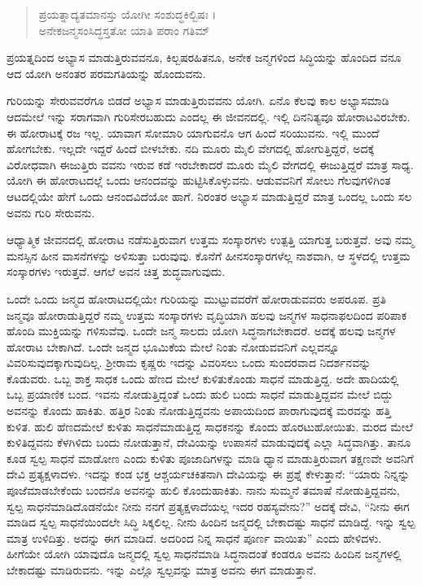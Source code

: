 \begin{verse}
ಪ್ರಯತ್ನಾದ್ಯತಮಾನಸ್ತು ಯೋಗೀ ಸಂಶುದ್ಧಕಿಲ್ಬಿಷಃ ।\\ಅನೇಕಜನ್ಮಸಂಸಿದ್ಧಸ್ತತೋ ಯಾತಿ ಪರಾಂ ಗತಿಮ್ 
\end{verse}

{\small ಪ್ರಯತ್ನದಿಂದ ಅಭ್ಯಾಸ ಮಾಡುತ್ತಿರುವವನೂ, ಕಿಲ್ಬಷರಹಿತನೂ, ಅನೇಕ ಜನ್ಮಗಳಿಂದ ಸಿದ್ಧಿಯನ್ನು ಹೊಂದಿದ ವನೂ ಆದ ಯೋಗಿ ಅನಂತರ ಪರಮಗತಿಯನ್ನು ಹೊಂದುವನು.}

ಗುರಿಯನ್ನು ಸೇರುವವರೆಗೂ ಬಿಡದೆ ಅಭ್ಯಾಸ ಮಾಡುತ್ತಿರುವವನು ಯೋಗಿ. ಏನೊ ಕೆಲವು ಕಾಲ ಅಭ್ಯಾಸಮಾಡಿ ಆದಮೇಲೆ ಇನ್ನು ಸರಾಗವಾಗಿ ಗುರಿಸೇರಬಹುದು ಎಂದಲ್ಲ ಈ ಜೀವನದಲ್ಲಿ. ಇಲ್ಲಿ ದಿನನಿತ್ಯವೂ ಹೋರಾಟವಿರಬೇಕು. ಈ ಹೋರಾಟಕ್ಕೆ ರಜ ಇಲ್ಲ. ಯಾವಾಗ ಸೋಮಾರಿ ಯಾಗುವನೊ ಆಗ ಹಿಂದೆ ಸರಿಯುವನು. ಇಲ್ಲಿ ಮುಂದೆ ಹೋಗಬೇಕು. ಇಲ್ಲದೇ ಇದ್ದರೆ ಹಿಂದೆ ಬೀಳಬೇಕು. ನದಿ ಮೂರು ಮೈಲಿ ವೇಗದಲ್ಲಿ ಹೋಗುತ್ತಿದ್ದರೆ, ಅದಕ್ಕೆ ವಿರೋಧವಾಗಿ ಈಜುತ್ತಿರು ವವನು ಇರುವ ಕಡೆ ಇರಬೇಕಾದರೆ ಮೂರು ಮೈಲಿ ವೇಗದಲ್ಲಿ ಈಜುತ್ತಿದ್ದರೆ ಮಾತ್ರ ಸಾಧ್ಯ. ಯೋಗಿ ಈ ಹೋರಾಟದಲ್ಲೆ ಒಂದು ಆನಂದವನ್ನು ಹುಟ್ಟಿಸಿಕೊಳ್ಳುವನು. ಆಡುವವನಿಗೆ ಸೋಲು ಗೆಲವುಗಳಿಗಿಂತ ಆಟದಲ್ಲಿಯೇ ಹೇಗೆ ಒಂದು ಆನಂದವಿದೆಯೋ ಹಾಗೆ. ನಿರಂತರ ಅಭ್ಯಾಸ ಮಾಡುತ್ತಿದ್ದರೆ ಮಾತ್ರ ಒಂದಲ್ಲ ಒಂದು ಸಲ ಅವನು ಗುರಿ ಸೇರುವನು.

ಆಧ್ಯಾತ್ಮಿಕ ಜೀವನದಲ್ಲಿ ಹೋರಾಟ ನಡೆಸುತ್ತಿರುವಾಗ ಉತ್ತಮ ಸಂಸ್ಕಾರಗಳು ಉತ್ಪತ್ತಿ ಯಾಗುತ್ತ ಬರುತ್ತವೆ. ಅವು ನಮ್ಮ ಮನಸ್ಸಿನ ಹೀನ ವಾಸನೆಗಳನ್ನು ಅಳಿಸುತ್ತಾ ಬರುವುವು. ಕೊನೆಗೆ ಹೀನಸಂಸ್ಕಾರಗಳೆಲ್ಲ ನಾಶವಾಗಿ, ಆ ಸ್ಥಳದಲ್ಲಿ ಉತ್ತಮ ಸಂಸ್ಕಾರಗಳು ಇರುತ್ತವೆ. ಆಗಲೆ ಅವನ ಚಿತ್ತ ಶುದ್ಧವಾಗುವುದು. 

ಒಂದೇ ಒಂದು ಜನ್ಮದ ಹೋರಾಟದಲ್ಲಿಯೇ ಗುರಿಯನ್ನು ಮುಟ್ಟುವವರೆಗೆ ಹೋರಾಡುವವರು ಅಪರೂಪ. ಪ್ರತಿ ಜನ್ಮವೂ ಹೋರಾಡುತ್ತಿದ್ದರೆ ನಮ್ಮ ಉತ್ತಮ ಸಂಸ್ಕಾರಗಳು ವೃದ್ಧಿಯಾಗಿ ಹಲವು ಜನ್ಮಗಳ ಸಾಧನಾಫಲದಿಂದ ಪರಿಪಾಕ ಹೊಂದಿ ಮುಕ್ತಿಯನ್ನು ಗಳಿಸುವೆವು. ಒಂದೇ ಜನ್ಮ ಸಾಲದು ಯೋಗಿ ಸಿದ್ಧನಾಗಬೇಕಾದರೆ. ಅದಕ್ಕೆ ಹಲವು ಜನ್ಮಗಳ ಹೋರಾಟ ಬೇಕಾಗಿದೆ. ಒಂದೇ ಜನ್ಮದ ಭೂಮಿಕೆಯ ಮೇಲೆ ನಿಂತು ನೋಡುವವನಿಗೆ ಎಲ್ಲವನ್ನೂ ವಿವರಿಸುವುದಕ್ಕಾಗುವುದಿಲ್ಲ. ಶ್ರೀರಾಮ ಕೃಷ್ಣರು ಇದನ್ನು ವಿವರಿಸಲು ಒಂದು ಸುಂದರವಾದ ನಿದರ್ಶನವನ್ನು ಕೊಡುವರು. ಒಬ್ಬ ಶಾಕ್ತ ಸಾಧಕ ಒಂದು ಹೆಣದ ಮೇಲೆ ಕುಳಿತುಕೊಂಡು ಸಾಧನೆ ಮಾಡುತ್ತಿದ್ದ. ಅದೇ ಹಾದಿಯಲ್ಲಿ ಒಬ್ಬ ಪ್ರಯಾಣಿಕ ಬಂದ. ಇವನು ನೋಡುತ್ತಿದ್ದಂತೆ ಒಂದು ಹುಲಿ ಬಂದು ಸಾಧನೆ ಮಾಡುತ್ತಿದ್ದವನ ಮೇಲೆ ಬಿದ್ದು ಅವನನ್ನು ಕೊಂದು ಹಾಕಿತು. ಹತ್ತಿರ ನಿಂತು ನೋಡುತ್ತಿದ್ದವನು ಅಪಾಯದಿಂದ ಪಾರಾಗುವುದಕ್ಕೆ ಮರವನ್ನು ಹತ್ತಿ ಕುಳಿತ. ಹುಲಿ ಹೆಣದಮೇಲೆ ಕುಳಿತು ಸಾಧನೆಮಾಡುತ್ತಿದ್ದ ಸಾಧಕನನ್ನು ಕೊಂದು ಹೊರಟುಹೋಯಿತು. ಮರದ ಮೇಲೆ ಕುಳಿತಿದ್ದವನು ಕೆಳಗಿಳಿದು ಬಂದು ನೋಡುತ್ತಾನೆ, ದೇವಿಯನ್ನು ಉಪಾಸನೆ ಮಾಡುವುದಕ್ಕೆ ಎಲ್ಲಾ ಸಿದ್ಧವಾಗಿತ್ತು. ತಾನೂ ಕೂಡ ಸ್ವಲ್ಪ ಸಾಧನೆ ಮಾಡೋಣ ಎಂದು ಕುಳಿತು ಪೂಜಾದಿಗಳನ್ನು ಮಾಡಿ ಧ್ಯಾನ ಮಾಡುತ್ತಿರುವಾಗ ತಕ್ಷಣವೇ ಅವನಿಗೆ ದೇವಿ ಪ್ರತ್ಯಕ್ಷಳಾದಳು. ಇದನ್ನು ಕಂಡ ಭಕ್ತ ಆಶ್ಚರ್ಯಚಕಿತನಾಗಿ ದೇವಿಯನ್ನು ಈ ಪ್ರಶ್ನೆ ಕೇಳುತ್ತಾನೆ: “ಯಾರು ನಿನ್ನನ್ನು ಪೂಜೆಮಾಡಬೇಕೆಂದು ಬಂದನೊ ಅವನನ್ನು ಹುಲಿ ಕೊಂದುಹಾಕಿತು. ನಾನು ಸುಮ್ಮನೆ ತಮಾಷೆ ನೋಡುತ್ತಿದ್ದವನು, ಸ್ವಲ್ಪ ಸಾಧನೆಮಾಡಿದೊಡನೆಯೇ ನೀನು ನನಗೆ ಪ್ರತ್ಯಕ್ಷಳಾದೆಯಲ್ಲ ಇದರ ರಹಸ್ಯವೇನು?” ಅದಕ್ಕೆ ದೇವಿ, “ನೀನು ಈಗ ಮಾಡಿದ ಸ್ವಲ್ಪ ಸಾಧನೆಯಿಂದಲೇ ಸಿದ್ಧಿ ಸಿಕ್ಕಲಿಲ್ಲ. ನೀನು ಹಿಂದಿನ ಜನ್ಮದಲ್ಲಿ ಬೇಕಾದಷ್ಟು ಸಾಧನೆ ಮಾಡಿದ್ದೆ. ಇನ್ನು ಸ್ವಲ್ಪ ಮಾತ್ರ ಉಳಿದಿತ್ತು. ಅದನ್ನು ಈಗ ಮಾಡಿದೆ. ಅದರಿಂದ ನಿನ್ನ ಸಾಧನೆ ಪೂರ್ಣ ವಾಯಿತು” ಎಂದು ಹೇಳಿದಳು. ಹೀಗೆಯೇ ಯೋಗಿ ಯಾವುದೊ ಜನ್ಮದಲ್ಲಿ ಸ್ವಲ್ಪ ಸಾಧನೆಮಾಡಿ ಸಿದ್ಧನಾದಂತೆ ಕಂಡರೂ ಅವನು ಹಿಂದಿನ ಜನ್ಮಗಳಲ್ಲಿ ಬೇಕಾದಷ್ಟು ಮಾಡಿರುವನು. ಇನ್ನು ಎಲ್ಲೊ ಸ್ವಲ್ಪವನ್ನು ಮಾತ್ರ ಅವನು ಈಗ ಮಾಡುತ್ತಾನೆ.

